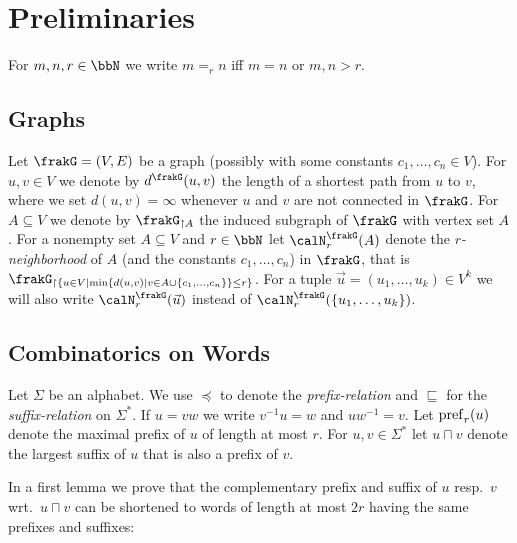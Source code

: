 \section{Preliminaries}
For $m,n,r\in\bbN$ we write $m =_r n$ iff $m=n$ or $m,n>r$.

\subsection{Graphs}
Let $\frakG=(V,E)$ be a graph (possibly with some constants $c_1,\dots,c_n\in V$). 
For $u,v\in V$ we denote by $d^\frakG(u,v)$ the length of a shortest path from $u$ to $v$, where we set $d(u,v) = \infty$ whenever $u$ and $v$ are not connected in $\frakG$.
For $A\subseteq V$ we denote by $\frakG_{\upharpoonright A}$ the induced subgraph of $\frakG$ with vertex set $A$. 
For a nonempty set $A\subseteq V$ and $r\in \bbN$ let $\calN_r^\frakG(A)$ denote the \emph{$r$-neighborhood} of $A$ (and the constants $c_1,\dots,c_n$) in $\frakG$, that is $\frakG_{\upharpoonright\{u\in V\mid \min\{d(u,v) \mid v\in A\cup\{c_1,\dots,c_n\}\} \leq r \}}$.
For a tuple $\vec{u} = (u_1,\ldots, u_k) \in V^k$ we will also write $\calN^\frakG_r(\vec{u})$ instead of $\calN^\frakG_r(\{u_1,\ldots, u_k\})$.

\subsection{Combinatorics on Words}
Let $\Sigma$ be an alphabet. We use $\preceq$ to denote the \emph{prefix-relation} and $\sqsubseteq$ for the \emph{suffix-relation} on $\Sigma^\ast$.  If $u= vw$ we write $v^{-1}u = w$ and
$uw^{-1} = v$.
Let $\operatorname{pref}_r(u)$ denote the maximal prefix of $u$ of length at most $r$. For $u,v\in\Sigma^\ast$ let $u \sqcap v$ denote the largest suffix of $u$ that is also a prefix of $v$.

In a first lemma we prove that the complementary prefix and suffix of $u$ resp.~$v$ wrt.~$u\sqcap v$ can be shortened to words of length at most $2r$ having the same prefixes and suffixes:

